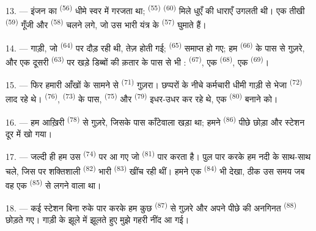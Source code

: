 13. --- इंजन का  \textsuperscript{(56)} धीमे स्वर में गरजता था;
 \textsuperscript{(55)}  \textsuperscript{(60)} मिले धुएँ
की धाराएँ उगलती थी। एक तीखी  \textsuperscript{(59)} गूँजी और
 \textsuperscript{(58)} चलने लगे, जो उस भारी यंत्र के
 \textsuperscript{(57)} घुमाते हैं।

\VUsaut{3.0mm}
\VUsaut{3.0mm}

14. --- गाड़ी, जो  \textsuperscript{(64)} पर दौड़ रही थी, तेज़
होती गई;  \textsuperscript{(65)} समाप्त हो गए; हम
 \textsuperscript{(66)} के पास से गुज़रे, और एक दूसरी
 \textsuperscript{(63)} पर खड़े डिब्बों की क़तार के पास से भी :
 \textsuperscript{(67)}, एक 
\textsuperscript{(68)}, एक  \textsuperscript{(69)}।


15. --- फिर हमारी आँखों के सामने से  \textsuperscript{(71)}
गुज़रा। छप्परों के नीचे कर्मचारी धीमी गाड़ी से भेजा 
\textsuperscript{(72)} लाद रहे थे।  \textsuperscript{(76)},
 \textsuperscript{(73)} के पास, 
\textsuperscript{(75)} और  \textsuperscript{(79)} इधर-उधर कर
रहे थे, एक  \textsuperscript{(80)} बनाने को।

16. --- हम आख़िरी  \textsuperscript{(78)} से गुज़रे, जिसके पास
काँटेवाला खड़ा था; हमने  \textsuperscript{(86)} पीछे छोड़ा और
स्टेशन दूर में खो गया।

17. --- जल्दी ही हम उस  \textsuperscript{(74)} पर आ गए जो
 \textsuperscript{(81)} पार करता है। पुल पार करके हम नदी के साथ-साथ
चले, जिस पर शक्तिशाली  \textsuperscript{(82)} भारी
 \textsuperscript{(83)} खींच रही थीं। हमने एक
 \textsuperscript{(84)} भी देखा, ठीक उस समय जब वह एक
 \textsuperscript{(85)} से लगने वाला था।

18. --- कई स्टेशन बिना रुके पार करके हम कुछ  \textsuperscript{(87)}
से गुज़रे और अपने पीछे  की अनगिनत 
\textsuperscript{(88)} छोड़ते गए। गाड़ी के झूले में झूलते हुए मुझे गहरी नींद आ गई।


